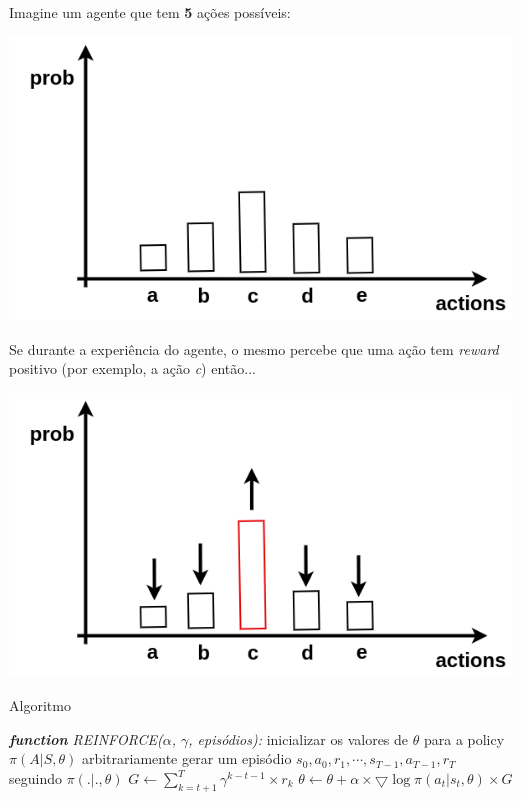\documentclass{beamer}
\begin{document}
\begin{frame}
	
	Imagine um agente que tem \textbf{5} ações possíveis: 
	
	\begin{center}
		\includegraphics[width=.9\textwidth]{img/distribuicao.png}
	\end{center}
\end{frame}


\begin{frame}
	Se durante a experiência do agente, o mesmo percebe que uma ação tem \textit{reward} positivo (por exemplo, a ação \textit{c}) então...
	\begin{center}
		\includegraphics[width=.8\textwidth]{img/distribuicao_alterada.png}
	\end{center}
\end{frame}

\begin{frame}{Algoritmo}
	\begin{algorithmic} 
		\STATE \emph{\textbf{function} REINFORCE($\alpha$, $\gamma$, episódios):}
		\STATE inicializar os valores de $\theta$ para a policy $\pi(A|S,\theta)$ arbitrariamente
		\STATE gerar um episódio ${s_{0},a_{0},r_{1},\cdots,s_{T-1},a_{T-1},r_{T}}$ seguindo $\pi(.|.,\theta)$
			\STATE $G \leftarrow \sum_{k=t+1}^{T} \gamma^{k-t-1} \times r_{k}$
			\STATE $\theta \leftarrow \theta + \alpha \times \bigtriangledown \log \pi(a_{t}|s_{t}, \theta) \times G$
		\ENDFOR
		\ENDFOR
	\end{algorithmic}
\end{frame}
\end{document}
